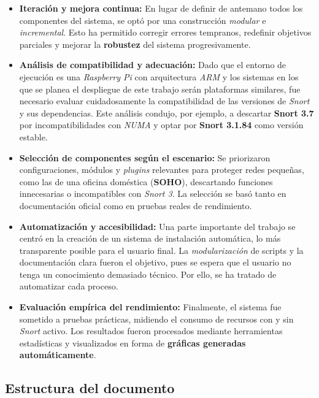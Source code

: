 \documentclass[11pt,a4paper,twoside]{report}
\begin{document}
\begin{itemize}
	\item \textbf{Iteración y mejora continua:} En lugar de definir de antemano todos los componentes del sistema, se optó por una construcción \textit{modular} e \textit{incremental}. Esto ha permitido corregir errores tempranos, redefinir objetivos parciales y mejorar la \textbf{robustez} del sistema progresivamente.
	
	\item \textbf{Análisis de compatibilidad y adecuación:} Dado que el entorno de ejecución es una \textit{Raspberry Pi} con arquitectura \textit{ARM} y los sistemas en los que se planea el despliegue de este trabajo serán plataformas similares, fue necesario evaluar cuidadosamente la compatibilidad de las versiones de \textit{Snort} y sus dependencias. Este análisis condujo, por ejemplo, a descartar \textbf{Snort 3.7} por incompatibilidades con \textit{NUMA} y optar por \textbf{Snort 3.1.84} como versión estable.
	
	\item \textbf{Selección de componentes según el escenario:} Se priorizaron configuraciones, módulos y \textit{plugins} relevantes para proteger redes pequeñas, como las de una oficina doméstica (\textbf{SOHO}), descartando funciones innecesarias o incompatibles con \textit{Snort 3}. La selección se basó tanto en documentación oficial como en pruebas reales de rendimiento.
	
	\item \textbf{Automatización y accesibilidad:} Una parte importante del trabajo se centró en la creación de un sistema de instalación automática, lo más transparente posible para el usuario final. La \textit{modularización} de scripts y la documentación clara fueron el objetivo, pues se espera que el usuario no tenga un conocimiento demasiado técnico. Por ello, se ha tratado de automatizar cada proceso.
	
	\item \textbf{Evaluación empírica del rendimiento:} Finalmente, el sistema fue sometido a pruebas prácticas, midiendo el consumo de recursos con y sin \textit{Snort} activo. Los resultados fueron procesados mediante herramientas estadísticas y visualizados en forma de \textbf{gráficas generadas automáticamente}.
\end{itemize}

\pagebreak

\subsection*{Estructura del documento}
\end{document}
